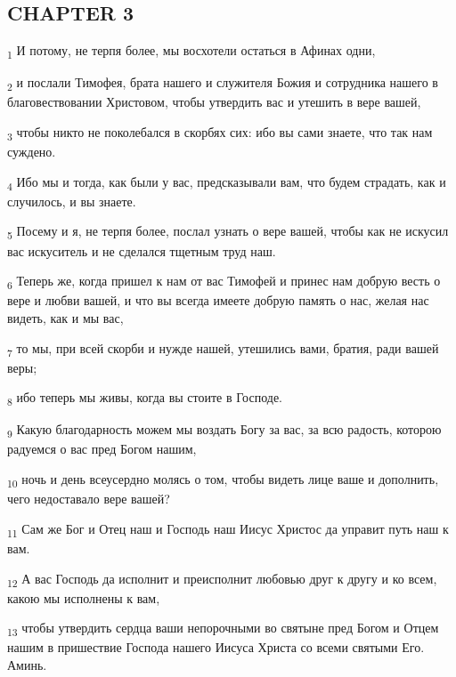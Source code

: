 \subsection{CHAPTER 3}
\begin{tcolorbox}
\textsubscript{1} И потому, не терпя более, мы восхотели остаться в Афинах одни,
\end{tcolorbox}
\begin{tcolorbox}
\textsubscript{2} и послали Тимофея, брата нашего и служителя Божия и сотрудника нашего в благовествовании Христовом, чтобы утвердить вас и утешить в вере вашей,
\end{tcolorbox}
\begin{tcolorbox}
\textsubscript{3} чтобы никто не поколебался в скорбях сих: ибо вы сами знаете, что так нам суждено.
\end{tcolorbox}
\begin{tcolorbox}
\textsubscript{4} Ибо мы и тогда, как были у вас, предсказывали вам, что будем страдать, как и случилось, и вы знаете.
\end{tcolorbox}
\begin{tcolorbox}
\textsubscript{5} Посему и я, не терпя более, послал узнать о вере вашей, чтобы как не искусил вас искуситель и не сделался тщетным труд наш.
\end{tcolorbox}
\begin{tcolorbox}
\textsubscript{6} Теперь же, когда пришел к нам от вас Тимофей и принес нам добрую весть о вере и любви вашей, и что вы всегда имеете добрую память о нас, желая нас видеть, как и мы вас,
\end{tcolorbox}
\begin{tcolorbox}
\textsubscript{7} то мы, при всей скорби и нужде нашей, утешились вами, братия, ради вашей веры;
\end{tcolorbox}
\begin{tcolorbox}
\textsubscript{8} ибо теперь мы живы, когда вы стоите в Господе.
\end{tcolorbox}
\begin{tcolorbox}
\textsubscript{9} Какую благодарность можем мы воздать Богу за вас, за всю радость, которою радуемся о вас пред Богом нашим,
\end{tcolorbox}
\begin{tcolorbox}
\textsubscript{10} ночь и день всеусердно молясь о том, чтобы видеть лице ваше и дополнить, чего недоставало вере вашей?
\end{tcolorbox}
\begin{tcolorbox}
\textsubscript{11} Сам же Бог и Отец наш и Господь наш Иисус Христос да управит путь наш к вам.
\end{tcolorbox}
\begin{tcolorbox}
\textsubscript{12} А вас Господь да исполнит и преисполнит любовью друг к другу и ко всем, какою мы исполнены к вам,
\end{tcolorbox}
\begin{tcolorbox}
\textsubscript{13} чтобы утвердить сердца ваши непорочными во святыне пред Богом и Отцем нашим в пришествие Господа нашего Иисуса Христа со всеми святыми Его. Аминь.
\end{tcolorbox}
